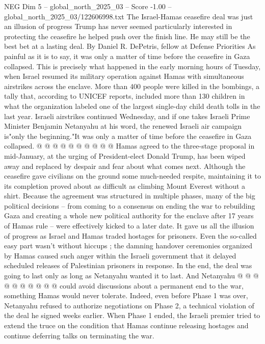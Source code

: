 \begin{textsample}{NEG Dim 5 – global\_north\_2025\_03 – Score -1.00 – global\_north\_2025\_03/122606998.txt}  \label{ex:f5_neg_293}
The Israel-Hamas ceasefire deal was just an illusion of progress Trump has never seemed particularly interested in protecting the ceasefire he helped push over the finish line.
He may still be the best bet at a lasting deal.
By Daniel R.
DePetris, fellow at Defense Priorities As painful as it is to say, it was only a matter of time before the ceasefire in Gaza collapsed.
This is precisely what happened in the early morning hours of Tuesday, when Israel resumed its military operation against Hamas with simultaneous airstrikes across the enclave.
More than 400 people were killed in the bombings, a tally that, according to UNICEF reports, included more than 130 children in what the organization labeled one of the largest single-day child death tolls in the last year.
Israeli airstrikes continued Wednesday, and if one takes Israeli Prime Minister Benjamin Netanyahu at his word, the renewed Israeli air campaign is"only the beginning."It was only a matter of time before the ceasefire in Gaza collapsed. @ @ @ @ @ @ @ @ @ @ Hamas agreed to the three-stage proposal in mid-January, at the urging of President-elect Donald Trump, has been wiped away and replaced by despair and fear about what comes next.
Although the ceasefire gave civilians on the ground some much-needed respite, maintaining it to its completion proved about as difficult as climbing Mount Everest without a shirt.
Because the agreement was structured in multiple phases, many of the big political decisions -- from coming to a consensus on ending the war to rebuilding Gaza and creating a whole new political authority for the enclave after 17 years of Hamas rule -- were effectively kicked to a later date.
It gave us all the illusion of progress as Israel and Hamas traded hostages for prisoners.
Even the so-called easy part wasn't without hiccups ; the damning handover ceremonies organized by Hamas caused such anger within the Israeli government that it delayed scheduled releases of Palestinian prisoners in response.
In the end, the deal was going to last only as long as Netanyahu wanted it to last.
And Netanyahu @ @ @ @ @ @ @ @ @ @ could avoid discussions about a permanent end to the war, something Hamas would never tolerate.
Indeed, even before Phase 1 was over, Netanyahu refused to authorize negotiations on Phase 2, a technical violation of the deal he signed weeks earlier.
When Phase 1 ended, the Israeli premier tried to extend the truce on the condition that Hamas continue releasing hostages and continue deferring talks on terminating the war.

\end{textsample}
